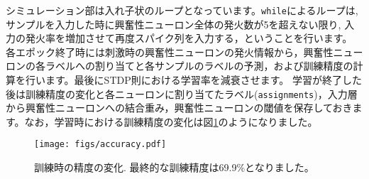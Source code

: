 シミュレーション部は入れ子状のループとなっています。\texttt{while}によるループは, サンプルを入力した時に興奮性ニューロン全体の発火数が5を超えない限り, 入力の発火率を増加させて再度スパイク列を入力する，ということを行います。
各エポック終了時には刺激時の興奮性ニューロンの発火情報から，興奮性ニューロンの各ラベルへの割り当てと各サンプルのラベルの予測，および訓練精度の計算を行います。最後にSTDP則における学習率を減衰させます。
学習が終了した後は訓練精度の変化と各ニューロンに割り当てたラベル(\texttt{assignments})，入力層から興奮性ニューロンへの結合重み，興奮性ニューロンの閾値を保存しておきます。なお，学習時における訓練精度の変化は図\ref{fig:MNISTaccuracy}のようになりました。
\begin{figure}[htbp]
    \centering
    \texttt{[image: figs/accuracy.pdf]}
    \caption{訓練時の精度の変化. 最終的な訓練精度は69.9\%となりました。}
    \label{fig:MNISTaccuracy}
\end{figure}
